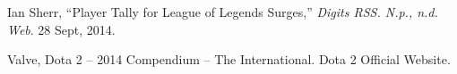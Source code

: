 \documentclass[conference]{IEEEtran}
\begin{document}


%
%
%


\begin{thebibliography}{10}

Ian Sherr, ``Player Tally for League of Legends Surges,'' \textit{Digits RSS. N.p., n.d. Web}. 28 Sept, 2014.

Valve, Dota 2 -- 2014 Compendium -- The International. Dota 2 Official Website.

\end{thebibliography}




\end{document}
